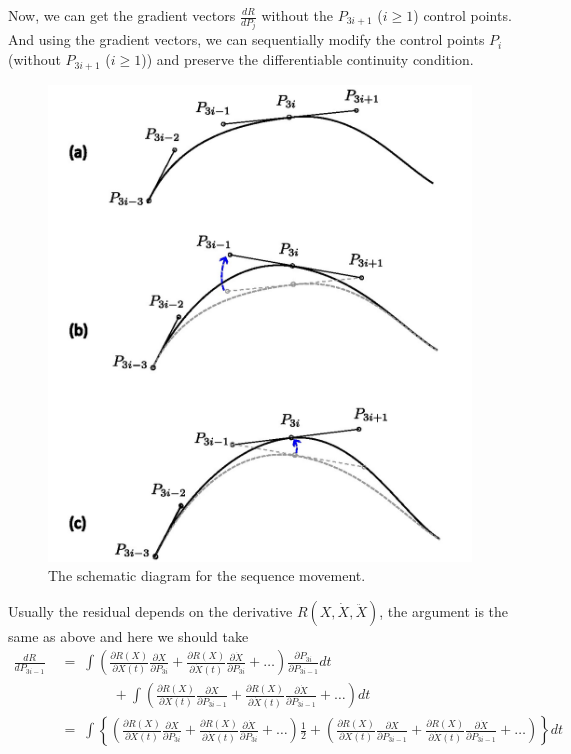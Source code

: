 \documentclass[12pt]{article}
\begin{document}
Now, we can get the gradient vectors $\frac{d R}{d P_j}$ without the $P_{3i+1}$ ($i\ge 1$) control points.
And using the gradient vectors, we can sequentially modify the control points $P_{i}$ (without $P_{3i+1}$ ($i\ge 1$)) and preserve the differentiable continuity condition.
%
\begin{figure}[H]
	\centering
	\includegraphics[width=0.5\linewidth]{move.jpg}
	\caption{The schematic diagram for the sequence movement.}
\end{figure}


Usually the residual depends on the derivative $R(X,\dot{X},\ddot{X})$, the argument is the same as above and here we should take 
%
\begin{align*}
	\frac{d R}{d P_{3i-1}} & \;=\; \int \left( \frac{\partial R(X)}{\partial X(t)} \frac{\partial X}{\partial P_{3i}} + \frac{\partial R(X)}{\partial \dot{X}(t)} \frac{\partial \dot{X}}{\partial P_{3i}} + \dots \right)\frac{\partial P_{3i}}{\partial P_{3i-1}} dt \\
	& \qquad \qquad + \int \left( \frac{\partial R(X)}{\partial X(t)} \frac{\partial X}{\partial P_{3i-1}} + \frac{\partial R(X)}{\partial \dot{X}(t)} \frac{\partial \dot{X}}{\partial P_{3i-1}} + \dots \right) dt \\
	& \;=\; \int \left\{ \left( \frac{\partial R(X)}{\partial X(t)} \frac{\partial X}{\partial P_{3i}} + \frac{\partial R(X)}{\partial \dot{X}(t)} \frac{\partial \dot{X}}{\partial P_{3i}} + \dots \right)\frac{1}{2} + \left( \frac{\partial R(X)}{\partial X(t)} \frac{\partial X}{\partial P_{3i-1}} + \frac{\partial R(X)}{\partial \dot{X}(t)} \frac{\partial \dot{X}}{\partial P_{3i-1}} + \dots \right) \right\} dt
\end{align*}
\end{document}
